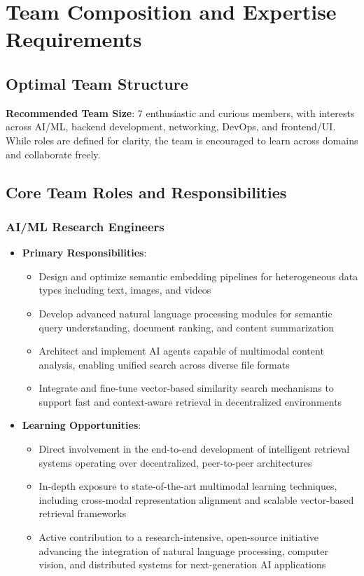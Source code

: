 \documentclass[11pt,a4paper]{article}
\begin{document}
\section{Team Composition and Expertise Requirements}

\subsection{Optimal Team Structure}
\textbf{Recommended Team Size}: 7 enthusiastic and curious members, with interests across AI/ML, backend development, networking, DevOps, and frontend/UI.  
While roles are defined for clarity, the team is encouraged to learn across domains and collaborate freely.

\subsection{Core Team Roles and Responsibilities}

\subsubsection{AI/ML Research Engineers}
\begin{itemize}
    \item \textbf{Primary Responsibilities}:
    \begin{itemize}
        \item Design and optimize semantic embedding pipelines for heterogeneous data types including text, images, and videos
        \item Develop advanced natural language processing modules for semantic query understanding, document ranking, and content summarization
        \item Architect and implement AI agents capable of multimodal content analysis, enabling unified search across diverse file formats
        \item Integrate and fine-tune vector-based similarity search mechanisms to support fast and context-aware retrieval in decentralized environments
    \end{itemize}
    
    \item \textbf{Learning Opportunities}:
    \begin{itemize}
        \item Direct involvement in the end-to-end development of intelligent retrieval systems operating over decentralized, peer-to-peer architectures
        \item In-depth exposure to state-of-the-art multimodal learning techniques, including cross-modal representation alignment and scalable vector-based retrieval frameworks
        \item Active contribution to a research-intensive, open-source initiative advancing the integration of natural language processing, computer vision, and distributed systems for next-generation AI applications
    \end{itemize}
\end{itemize}
\end{document}
